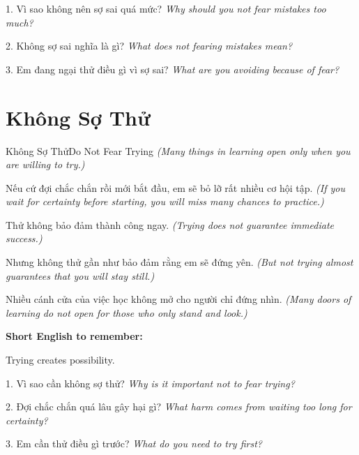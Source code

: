 \begin{tuhocnhanh}
1. Vì sao không nên sợ sai quá mức? \textit{Why should you not fear mistakes too much?}

2. Không sợ sai nghĩa là gì? \textit{What does not fearing mistakes mean?}

3. Em đang ngại thử điều gì vì sợ sai? \textit{What are you avoiding because of fear?}
\end{tuhocnhanh}
\ngancach

\section{Không Sợ Thử}
\begin{truyen}{Không Sợ Thử}{Do Not Fear Trying}
\textit{(Many things in learning open only when you are willing to try.)}

Nếu cứ đợi chắc chắn rồi mới bắt đầu, em sẽ bỏ lỡ rất nhiều cơ hội tập.
\textit{(If you wait for certainty before starting, you will miss many chances to practice.)}

Thử không bảo đảm thành công ngay.
\textit{(Trying does not guarantee immediate success.)}

Nhưng không thử gần như bảo đảm rằng em sẽ đứng yên.
\textit{(But not trying almost guarantees that you will stay still.)}
\end{truyen}

\begin{baihoc}
Nhiều cánh cửa của việc học không mở cho người chỉ đứng nhìn.
\textit{(Many doors of learning do not open for those who only stand and look.)}
\end{baihoc}

\begin{ghinhoanh}
\textbf{Short English to remember:}

Trying creates possibility.

\end{ghinhoanh}

\begin{tuhocnhanh}
1. Vì sao cần không sợ thử? \textit{Why is it important not to fear trying?}

2. Đợi chắc chắn quá lâu gây hại gì? \textit{What harm comes from waiting too long for certainty?}

3. Em cần thử điều gì trước? \textit{What do you need to try first?}
\end{tuhocnhanh}
\ngancach

